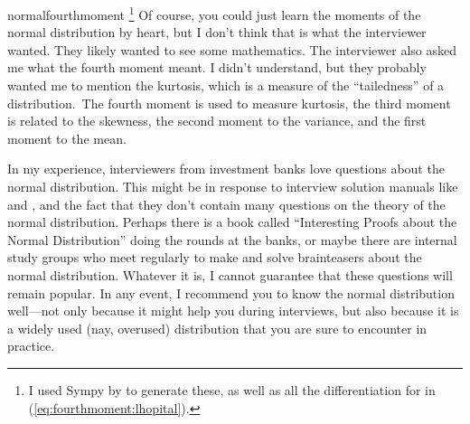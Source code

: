 \begin{answer}{normalfourthmoment}
\footnote{I used Sympy by \citet{Sympy} to generate these, as well as all the differentiation for in (\ref{eq:fourthmoment:lhopital}).}
Of course, you could just learn the moments of the normal distribution by heart, but I don't think that is what the interviewer wanted.
They likely wanted to see some mathematics.
The interviewer also asked me what the fourth moment meant.
I didn't understand, but they probably wanted me to mention the kurtosis, which is a measure of the ``tailedness'' of a distribution.\
The fourth moment is used to measure kurtosis,
the third moment is related to the skewness,
the second moment to the variance, and the first moment to the mean.


In my experience, interviewers from investment banks love questions about the normal distribution.
This might be in response to interview solution manuals like
\citet{HeardOnTheStreet} and \citet{JoshiQA},
and the fact that they don't contain many questions on the theory of the normal distribution.
Perhaps there is a book called ``Interesting Proofs about the Normal Distribution'' doing the rounds at the banks, or maybe there are internal study groups who meet regularly to make and solve brainteasers about the normal distribution.
Whatever it is, I cannot guarantee that these questions will remain popular.
In any event, I recommend you to know the normal distribution well---not only because it might help you during interviews, but also because it is a widely used (nay, overused) distribution that you are sure to encounter in practice.
\end{answer}
